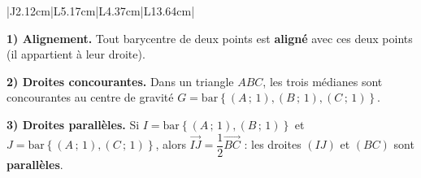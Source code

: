 \documentclass[10pt,a4paper,landscape]{article}
\newcommand{\vc}[1]{\overrightarrow{#1}}                                 %
\newcommand{\barG}[1]{\mathrm{bar}\left\{#1\right\}}                      %
\begin{document}
{\begin{longtable}{|J{2.12cm}|L{5.17cm}|L{4.37cm}|L{13.64cm}|}
\par{}\par

\par{}\par\nobreak

\textbf{1) Alignement.} Tout barycentre de deux points est \textbf{aligné} avec ces deux points (il appartient à leur droite).\par
\textbf{2) Droites concourantes.} Dans un triangle $ABC$, les trois médianes sont concourantes au centre de
gravité $G=\barG{(A\,;\,1),(B\,;\,1),(C\,;\,1)}$.\par
\textbf{3) Droites parallèles.} Si $I=\barG{(A\,;\,1),(B\,;\,1)}$ et $J=\barG{(A\,;\,1),(C\,;\,1)}$, alors
$\vc{IJ}=\dfrac{1}{2}\vc{BC}$ : les droites $(IJ)$ et $(BC)$ sont \textbf{parallèles}.


\end{longtable}}
\end{document}
